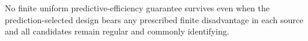 No finite uniform predictive-efficiency guarantee survives even when the prediction-selected design bears any prescribed finite disadvantage in each source and all candidates remain regular and commonly identifying.